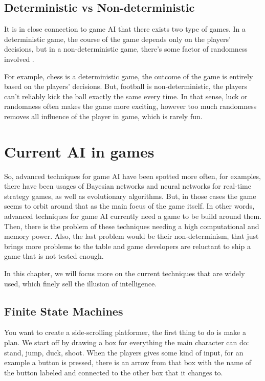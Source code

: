 \documentclass[a4paper, 12pt]{book}
\begin{document}
\section{Deterministic vs Non-deterministic}
It is in close connection to game AI that there exists two type of games. In a deterministic game, the course of the game depends only on the players’ decisions, but in a non-deterministic game, there’s some factor of randomness involved \cite{DeepLearningGO}. %

For example, chess is a deterministic game, the outcome of the game is entirely based on the players' decisions. But, football is non-deterministic, the players can't reliably kick the ball exactly the same every time. In that sense, luck or randomness often makes the game more exciting, however too much randomness removes all influence of the player in game, which is rarely fun.


\chapter{Current AI in games}
\label{ch2}

So, advanced techniques for game AI have been spotted more often, for examples, there have been usages of Bayesian networks and neural networks for real-time strategy games, as well as evolutionary algorithms. But, in those cases the game seems to orbit around that as the main focus of the game itself. In other words, advanced techniques for game AI currently need a game to be build around them. Then, there is the problem of these techniques needing a high computational and memory power. Also, the last problem would be their non-determinism, that just brings more problems to the table and game developers are reluctant to ship a game that is not tested enough.

In this chapter, we will focus more on the current techniques that are widely used, which finely sell the illusion of intelligence.

\section{Finite State Machines}

You want to create a side-scrolling platformer, the first thing to do is make a plan. We start off by drawing a box for everything the main character can do: stand, jump, duck, shoot. When the players gives some kind of input, for an example a button is pressed, there is an arrow from  that box with the name of the button labeled and connected to the other box that it changes to.
\end{document}
